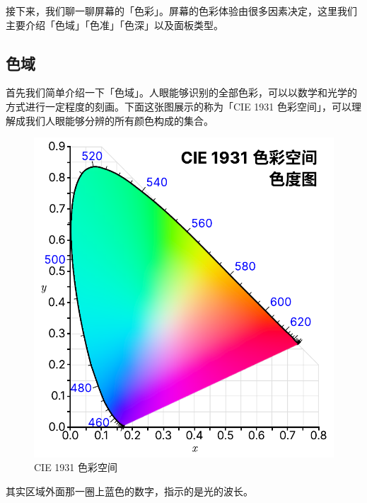 接下来，我们聊一聊屏幕的「色彩」。屏幕的色彩体验由很多因素决定，这里我们主要介绍「色域」「色准」「色深」以及面板类型。

\subsection{色域}

首先我们简单介绍一下「色域」。人眼能够识别的全部色彩，可以以数学和光学的方式进行一定程度的刻画。下面这张图展示的称为「CIE 1931 色彩空间」，可以理解成我们人眼能够分辨的所有颜色构成的集合。

\begin{figure}[htb!]
  \centering
  \includegraphics[width=.52\textwidth]{assets/advanced/CIE1931xy_blank.pdf}
  \caption{CIE 1931 色彩空间}
  \label{fig:CIE1931xy_blank}
\end{figure}

\begin{note}
  其实区域外面那一圈上蓝色的数字，指示的是光的波长。
\end{note}

